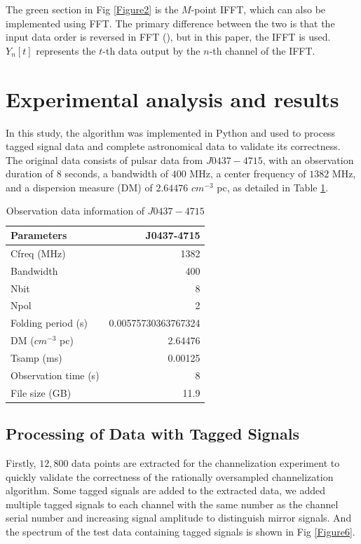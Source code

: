 \documentclass[referee]{raa}
\begin{document}
The green section in Fig \ref{Figure2} is the $M$-point IFFT, which can also be implemented using FFT. The primary difference between the two is that the input data order is reversed in FFT (\citealt{Renfors+2017}), but in this paper, the IFFT is used. $Y_n[t]$ represents the $t$-th data output by the $n$-th channel of the IFFT.


\section{Experimental analysis and results}

In this study, the algorithm was implemented in Python and used to process tagged signal data and complete astronomical data to validate its correctness. The original data consists of pulsar data from $J0437-4715$, with an observation duration of $8$ seconds, a bandwidth of $400$ MHz, a center frequency of $1382$ MHz, and a dispersion measure (DM) of $2.64476$ $cm^{-3}$ pc, as detailed in Table \ref{tab:inf}.

\begin{table}
\centering
\begin{tabular}{l|r}
Parameters & J0437-4715 \\\hline
Cfreq (MHz) & 1382 \\
Bandwidth & 400 \\
Nbit & 8 \\
Npol & 2 \\
Folding period (s) & 0.00575730363767324 \\
DM ($cm^{-3}$ pc) & 2.64476 \\
Tsamp (ms) & 0.00125 \\
Observation time (s) & 8 \\
File size (GB) &11.9 \\
\end{tabular}
\caption{\label{tab:inf}Observation data information of $J0437-4715$}
\end{table}
\FloatBarrier  %

\subsection{Processing of Data with Tagged Signals}

Firstly, $12,800$ data points are extracted for the channelization experiment to quickly validate the correctness of the rationally oversampled channelization algorithm. Some tagged signals are added to the extracted data, 
we added multiple tagged signals to each channel with the same number as the channel serial number and increasing signal amplitude to distinguish mirror signals.
And the spectrum of the test data containing tagged signals is shown in Fig \ref{Figure6}.
\end{document}
